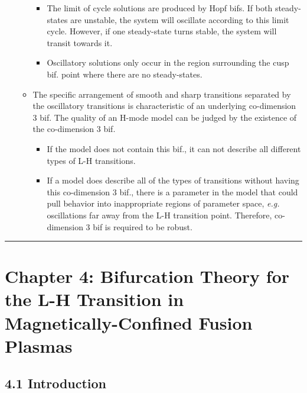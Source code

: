 \documentclass[a4paper]{article}
\begin{document}
\begin{itemize}
\begin{itemize}
    \begin{itemize}
    \item
      The limit of cycle solutions are produced by Hopf bifs. If both
      steady-states are unstable, the system will oscillate according to
      this limit cycle. However, if one steady-state turns stable, the
      system will transit towards it.
    \item
      Oscillatory solutions only occur in the region surrounding the
      cusp bif. point where there are no steady-states.
    \end{itemize}
  \item
    The specific arrangement of smooth and sharp transitions separated
    by the oscillatory transitions is characteristic of an underlying
    co-dimension 3 bif. The quality of an H-mode model can be judged by
    the existence of the co-dimension 3 bif.

    \begin{itemize}
    \item
      If the model does not contain this bif., it can not describe all
      different types of L-H transitions.
    \item
      If a model does describe all of the types of transitions without
      having this co-dimension 3 bif., there is a parameter in the model
      that could pull behavior into inappropriate regions of parameter
      space, \emph{e.g.} oscillations far away from the L-H transition
      point. Therefore, co-dimension 3 bif is required to be robust.
    \end{itemize}
  \end{itemize}
\end{itemize}

\begin{center}\rule{3in}{0.4pt}\end{center}

\section{Chapter 4: Bifurcation Theory for the L-H Transition in
Magnetically-Confined Fusion
Plasmas}\label{chapter-4-bifurcation-theory-for-the-l-h-transition-in-magnetically-confined-fusion-plasmas}

\subsection{4.1 Introduction}\label{introduction-1}
\end{document}
